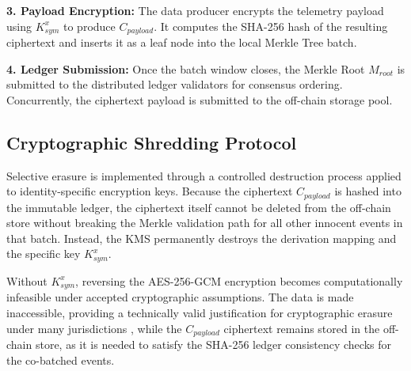 \documentclass[conference]{IEEEtran}
\begin{document}
\textbf{3. Payload Encryption:} The data producer encrypts the telemetry payload using $K_{sym}^{x}$ to produce $C_{payload}$. It computes the SHA-256 hash of the resulting ciphertext and inserts it as a leaf node into the local Merkle Tree batch.

\textbf{4. Ledger Submission:} Once the batch window closes, the Merkle Root $M_{root}$ is submitted to the distributed ledger validators for consensus ordering. Concurrently, the ciphertext payload is submitted to the off-chain storage pool.

\subsection{Cryptographic Shredding Protocol}

Selective erasure is implemented through a controlled destruction process applied to identity-specific encryption keys. Because the ciphertext $C_{payload}$ is hashed into the immutable ledger, the ciphertext itself cannot be deleted from the off-chain store without breaking the Merkle validation path for all other innocent events in that batch. Instead, the KMS permanently destroys the derivation mapping and the specific key $K_{sym}^{x}$. 

Without $K_{sym}^{x}$, reversing the AES-256-GCM encryption becomes computationally infeasible under accepted cryptographic assumptions. The data is made inaccessible, providing a technically valid justification for cryptographic erasure under many jurisdictions \cite{b32}, while the $C_{payload}$ ciphertext remains stored in the off-chain store, as it is needed to satisfy the SHA-256 ledger consistency checks for the co-batched events.
\end{document}
